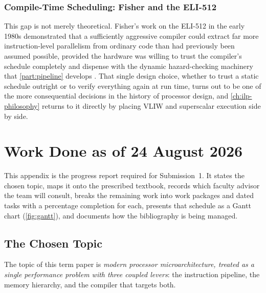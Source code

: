 \documentclass[12pt,a4paper]{report}
\begin{document}
\subsection{Compile-Time Scheduling: Fisher and the ELI-512}

This gap is not merely theoretical. Fisher's work on the ELI-512 in the
early 1980s demonstrated that a sufficiently aggressive compiler could
extract far more instruction-level parallelism from ordinary code than
had previously been assumed possible, provided the hardware was willing
to trust the compiler's schedule completely and dispense with the
dynamic hazard-checking machinery that \cref{part:pipeline} develops
\cite{fisher1983}. That single design choice, whether to trust a static
schedule outright or to verify everything again at run time, turns out
to be one of the more consequential decisions in the history of
processor design, and \cref{ch:ilp-philosophy} returns to it directly by
placing VLIW and superscalar execution side by side.


\chapter{Work Done as of 24 August 2026}
\label{app:progress}

This appendix is the progress report required for Submission~1. It
states the chosen topic, maps it onto the prescribed textbook, records
which faculty advisor the team will consult, breaks the remaining work
into work packages and dated tasks with a percentage completion for
each, presents that schedule as a Gantt chart
(\cref{fig:gantt}), and documents how the bibliography is being managed.

\section{The Chosen Topic}
\label{sec:topic}

The topic of this term paper is \emph{modern processor
microarchitecture, treated as a single performance problem with three
coupled levers}: the instruction pipeline, the memory hierarchy, and the
compiler that targets both.
\end{document}
